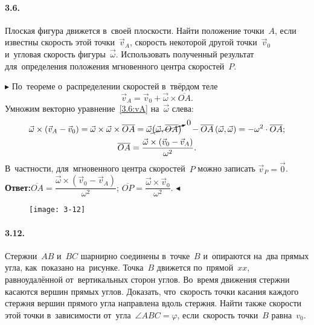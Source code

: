\documentclass{weekly}
\begin{document}

\paragraph{3.6.} Плоская фигура движется в~своей плоскости.
Найти положение точки~$A$, если известны скорость этой точки~$\vec v_A$,
скорость некоторой другой точки~$\vec v_0$ и~угловая скорость
фигуры~$\vec\omega$. Использовать полученный результат для~определения
положения мгновенного центра скоростей~$P$.

$\blacktriangleright$ По~теореме о~распределении скоростей
в~твёрдом теле
\begin{equation}\label{3.6:vA}
    \vec v_A = \vec v_0 + \vec\omega \times \overline{OA}.
\end{equation}
Умножим векторно уравнение~\eqref{3.6:vA} на~$\vec\omega$ слева:
\begin{gather}
    \vec\omega \times \left(\vec v_A - \vec v_0\right) =
            \vec\omega \times \vec\omega \times \overline{OA}
        = \vec\omega \cancelto{0}
            {\left(\vec\omega, \overline{OA}\right)}\quad -
            \overline{OA} \left(\vec\omega, \vec\omega\right)
        = -\omega^2 \cdot \overline{OA}; \\[\parskip]
    \overline{OA} = \frac{\vec\omega \times
            \left(\vec v_0 - \vec v_A\right)}{\omega^2}.
\end{gather}
В~частности, для~мгновенного центра скоростей~$P$ можно записать
$\vec v_P = \vec 0$.\\[-\parskip]

\textbf{Ответ:}\quad $\overline{OA} = \dfrac{\vec\omega \times
\left(\vec v_0 - \vec v_A\right)}{\omega^2}$;\qquad
$\overline{OP} = \dfrac{\vec\omega \times \vec v_0}{\omega^2}$.
\hfill $\blacktriangleleft$


\begin{wrapfigure}[8]{r}{4.5cm}\vspace{-6mm}
    \texttt{[image: 3-12]}
\end{wrapfigure}
\paragraph{3.12.} Стержни~$AB$ и~$BC$ шарнирно соединены в~точке~$B$
и~опираются на~два прямых угла, как~показано на~рисунке.
Точка~$B$ движется по~прямой~$xx$, равноудалённой от~вертикальных сторон
углов. Во~время движения стержни касаются вершин прямых углов.
Доказать, что~скорость точки касания каждого стержня вершин прямого угла
направлена вдоль стержня. Найти также скорости этой точки в~зависимости
от~угла~$\angle ABC = \varphi$, если~скорость точки~$B$ равна~$v_0$.
\end{document}
